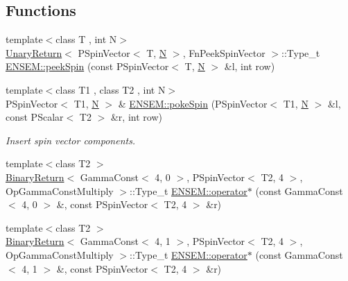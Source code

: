 \subsection*{Functions}
\begin{DoxyCompactItemize}
\item 
{\footnotesize template$<$class T , int N$>$ }\\\mbox{\hyperlink{structUnaryReturn}{Unary\+Return}}$<$ P\+Spin\+Vector$<$ T, \mbox{\hyperlink{adat__devel_2lib_2hadron_2operator__name__util_8cc_a7722c8ecbb62d99aee7ce68b1752f337}{N}} $>$, Fn\+Peek\+Spin\+Vector $>$\+::Type\+\_\+t \mbox{\hyperlink{group__primspinvector_gad13d4acbc90e4d69a8528585ad1c35c8}{E\+N\+S\+E\+M\+::peek\+Spin}} (const P\+Spin\+Vector$<$ T, \mbox{\hyperlink{adat__devel_2lib_2hadron_2operator__name__util_8cc_a7722c8ecbb62d99aee7ce68b1752f337}{N}} $>$ \&l, int row)
\item 
{\footnotesize template$<$class T1 , class T2 , int N$>$ }\\P\+Spin\+Vector$<$ T1, \mbox{\hyperlink{adat__devel_2lib_2hadron_2operator__name__util_8cc_a7722c8ecbb62d99aee7ce68b1752f337}{N}} $>$ \& \mbox{\hyperlink{group__primspinvector_ga55ef7594c5803a6f510d30a63e5aab4b}{E\+N\+S\+E\+M\+::poke\+Spin}} (P\+Spin\+Vector$<$ T1, \mbox{\hyperlink{adat__devel_2lib_2hadron_2operator__name__util_8cc_a7722c8ecbb62d99aee7ce68b1752f337}{N}} $>$ \&l, const P\+Scalar$<$ T2 $>$ \&r, int row)
\begin{DoxyCompactList}\small\item\em Insert spin vector components. \end{DoxyCompactList}\item 
{\footnotesize template$<$class T2 $>$ }\\\mbox{\hyperlink{structBinaryReturn}{Binary\+Return}}$<$ Gamma\+Const$<$ 4, 0 $>$, P\+Spin\+Vector$<$ T2, 4 $>$, Op\+Gamma\+Const\+Multiply $>$\+::Type\+\_\+t \mbox{\hyperlink{group__primspinvector_ga78eeeb22b735ad934f6d55320f04be68}{E\+N\+S\+E\+M\+::operator$\ast$}} (const Gamma\+Const$<$ 4, 0 $>$ \&, const P\+Spin\+Vector$<$ T2, 4 $>$ \&r)
\item 
{\footnotesize template$<$class T2 $>$ }\\\mbox{\hyperlink{structBinaryReturn}{Binary\+Return}}$<$ Gamma\+Const$<$ 4, 1 $>$, P\+Spin\+Vector$<$ T2, 4 $>$, Op\+Gamma\+Const\+Multiply $>$\+::Type\+\_\+t \mbox{\hyperlink{group__primspinvector_ga78fc0ed12245c6b5e7ab51e07bd4c553}{E\+N\+S\+E\+M\+::operator$\ast$}} (const Gamma\+Const$<$ 4, 1 $>$ \&, const P\+Spin\+Vector$<$ T2, 4 $>$ \&r)

\end{DoxyCompactItemize}
